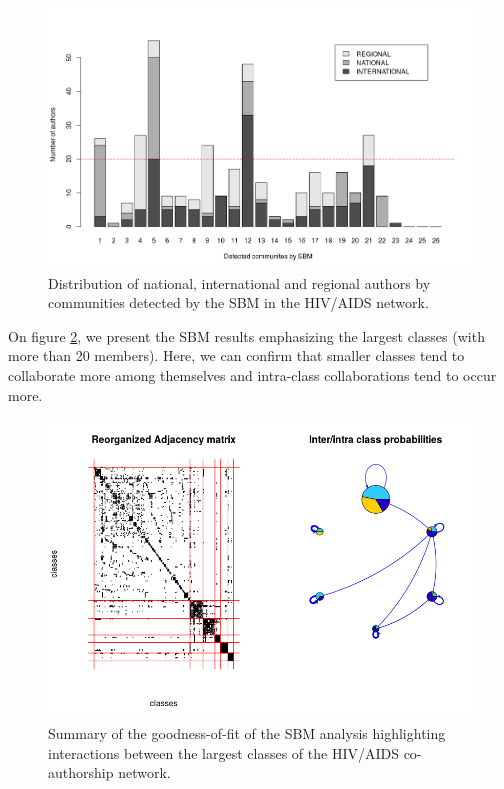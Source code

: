 \begin{figure}[h!]
\centering
\includegraphics[scale=0.5]{Chapters/hiv/statMod/hiv_sbm_barplot}
\caption{Distribution of national, international and regional authors by communities detected by the SBM in the HIV/AIDS network.}
\label{fig:hiv_sbmdist}
\end{figure}

On figure \ref{fig:hiv_sbmgof2}, we present the SBM results emphasizing the largest classes (with more than 20 members). Here, we can confirm that smaller classes tend to collaborate more among themselves and intra-class collaborations tend to occur more.

\begin{figure}[h!]
\centering
\includegraphics[scale=0.65]{Chapters/hiv/statMod/hiv_sbm2}
\caption{Summary of the goodness-of-fit of the SBM analysis highlighting interactions between the largest classes of the HIV/AIDS co-authorship network.}
\label{fig:hiv_sbmgof2}
\end{figure}

